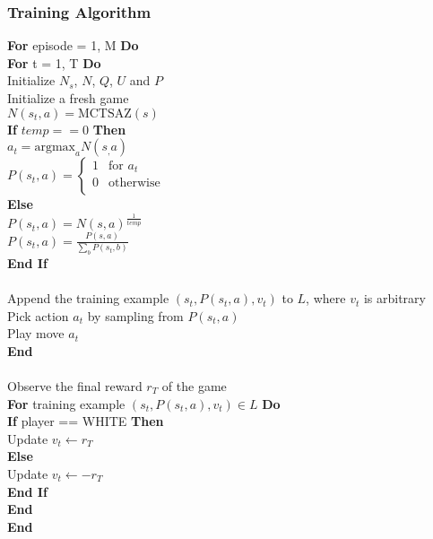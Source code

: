 \documentclass{article}
\begin{document}
\subsubsection{Training Algorithm}
\textbf{For} episode = 1, M \textbf{Do} \\
\indent \textbf{For} t = 1, T \textbf{Do} \\
\indent \indent Initialize $N_s$, $N$, $Q$, $U$ and $P$ \\
\indent \indent Initialize a fresh game \\
\indent \indent $N(s_t,a) = \text{MCTSAZ}(s)$ \\
\indent \indent \textbf{If} $temp == 0$ \textbf{Then} \\
\indent \indent \indent $a_t = \text{argmax}_a N(s_,a)$ \\
\indent \indent \indent $P(s_t,a) = 
\begin{cases}
	1		& \text{for } a_t \\
	0    	& \text{otherwise} \\
\end{cases}
$ \\
\indent \indent \textbf{Else} \\
\indent \indent \indent $P(s_t,a) = N(s,a)^{\frac{1}{temp}}$ \\
\indent \indent \indent $P(s_t,a) = \frac{P(s,a)}{\sum\nolimits_{b}P(s_t,b)}$ \\
\indent \indent \textbf{End If} \\
\\
\indent \indent Append the training example $(s_t, P(s_t,a), v_t)$ to $L$, where $v_t$ is arbitrary \\
\indent \indent Pick action $a_t$ by sampling from $P(s_t,a)$ \\
\indent \indent Play move $a_t$ \\
\indent \textbf{End} \\
\\
\indent Observe the final reward $r_T$ of the game \\
\indent \textbf{For} training example $(s_t, P(s_t,a), v_t) \in L$ \textbf{Do} \\
\indent \indent \textbf{If} player == WHITE \textbf{Then} \\
\indent \indent \indent Update $v_t \leftarrow r_T$ \\
\indent \indent \textbf{Else} \\
\indent \indent \indent Update $v_t \leftarrow -r_T$ \\
\indent \indent \textbf{End If} \\
\indent \textbf{End} \\
\textbf{End} \\



\pagebreak
\end{document}
